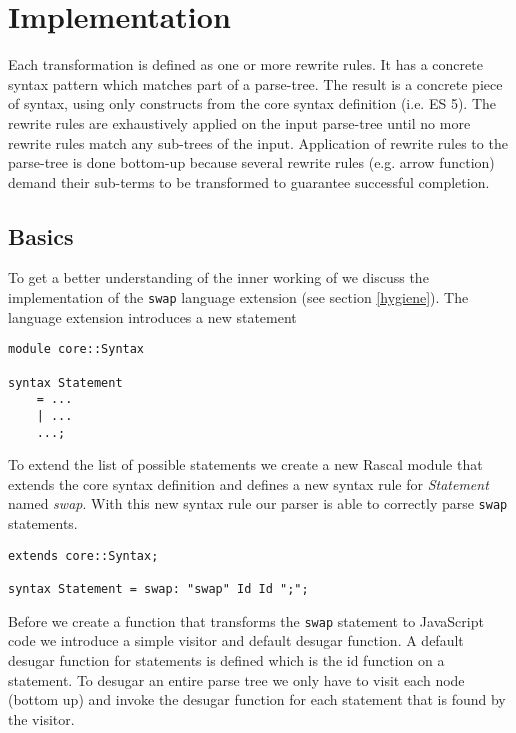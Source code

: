 \chapter{Implementation \projectname} %

\label{Chapter5}


Each transformation is defined as one or more rewrite rules. It has a concrete syntax pattern which matches part of a parse-tree. The result is a concrete piece of syntax, using only constructs from the core syntax definition (i.e. ES 5).
The rewrite rules are exhaustively applied on the input parse-tree until no more rewrite rules match any sub-trees of the input. Application of rewrite rules to the parse-tree is done bottom-up because several rewrite rules (e.g. arrow function) demand their sub-terms to be transformed to guarantee successful completion.

\section{Basics}
To get a better understanding of the inner working of \projectname we discuss the implementation of the \lstinline$swap$ language extension (see section \ref{hygiene}). The language extension introduces a new statement 

\begin{lstlisting}[caption=Core syntax,language=rascal]
module core::Syntax

syntax Statement 
	= ...
	| ...
	...;
\end{lstlisting}

To extend the list of possible statements we create a new Rascal module that extends the core syntax definition and defines a new syntax rule for \textit{Statement} named \textit{swap}. With this new syntax rule our parser is able to correctly parse \lstinline$swap$ statements.

\begin{lstlisting}[caption=Swap statement syntax,language=rascal]
extends core::Syntax;

syntax Statement = swap: "swap" Id Id ";";
\end{lstlisting}

Before we create a function that transforms the \lstinline$swap$ statement to JavaScript code we introduce a simple visitor and default desugar function. A default desugar function for statements is defined which is the id function on a statement. To desugar an entire parse tree we only have to visit each node (bottom up) and invoke the desugar function for each statement that is found by the visitor.


